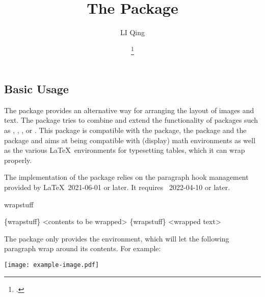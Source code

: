 \documentclass{ctxdoc}
\begin{document}

  \title{\bfseries The  Package}
  \author{LI Qing}
  \date{\filedate\qquad\fileversion\thanks{\gitsha{\ExplFileVersion}.}}
  \maketitle

  \begin{documentation}

  \section{Basic Usage}

  The  package provides an alternative way for arranging the layout of images and text.
  The  package tries to combine and extend the functionality of packages such as , , ,
   or .
  This package is compatible with the  package, the  package and the  package and aims at being compatible with (display) math environments as well as the various \LaTeX\ environments for typesetting tables, which it can wrap properly.

  The implementation of the  package relies on the paragraph hook management provided by \LaTeX\ 2021-06-01 or later. It requires \LaTeXiii\ 2022-04-10 or later.

  \begin{function}{wrapstuff}
    \begin{syntax}
      \{wrapstuff\}
        <contents to be wrapped>
      \{wrapstuff\}
      <wrapped text>
    \end{syntax}
    The  package only provides the  environment, which will let the following paragraph wrap around its contents. For example:
    \begin{Example}[frame=single,numbers=none,gobble=5]
      \begin{wrapstuff}[c,top=1]
        \texttt{[image: example-image.pdf]}
      \end{wrapstuff}
      \zhlipsum[1][name=zhufu]
    \end{Example}
  \end{function}


\end{documentation}
\end{document}
